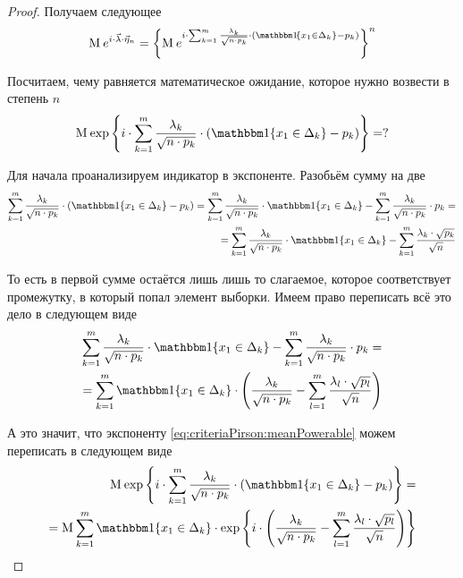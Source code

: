 \begin{proof}
  Получаем следующее
  \begin{align*}
      \mean{e^{i \cdot \vec{\lambda} \cdot \vec{\eta}_n}}
      = \left\{ \mean{e^{i \cdot \sum_{k=1}^{m}\frac{\lambda_k}{
          \sqrt{n \cdot p_k}} \cdot \left(
          \Indicator{x_1 \in \Delta_k} - p_k \right)}} \right\}^n
  \end{align*}

  Посчитаем, чему равняется математическое ожидание, которое нужно возвести
  в степень $n$
  \begin{equation}\label{eq:criteriaPirson:meanPowerable}
      \mean{\exp{\left\{ i \cdot \sum_{k=1}^{m}\frac{\lambda_k}{
          \sqrt{n \cdot p_k}} \cdot \left(
          \Indicator{x_1 \in \Delta_k} - p_k \right) \right\}}} = ?
  \end{equation}

  Для начала проанализируем индикатор в экспоненте.
  Разобьём сумму на две
  \begin{align*}
      \sum_{k=1}^{m}\frac{\lambda_k}{\sqrt{n \cdot p_k}} \cdot \left(
          \Indicator{x_1 \in \Delta_k} - p_k \right)
      = \sum_{k=1}^{m}\frac{\lambda_k}{\sqrt{n \cdot p_k}}
          \cdot \Indicator{x_1 \in \Delta_k}
      - \sum_{k=1}^{m}\frac{\lambda_k}{\sqrt{n \cdot p_k}} \cdot p_k = \\
      = \sum_{k=1}^{m}\frac{\lambda_k}{\sqrt{n \cdot p_k}}
          \cdot \Indicator{x_1 \in \Delta_k}
      - \sum_{k=1}^{m}\frac{\lambda_k \cdot \sqrt{p_k}}{\sqrt{n}}
  \end{align*}

  То есть в первой сумме остаётся лишь лишь то слагаемое, которое
  соответствует промежутку, в который попал элемент выборки. Имеем право
  переписать всё это дело в следующем виде
  \begin{align*}
      \sum_{k=1}^{m}\frac{\lambda_k}{\sqrt{n \cdot p_k}}
          \cdot \Indicator{x_1 \in \Delta_k}
      - \sum_{k=1}^{m}\frac{\lambda_k}{\sqrt{n \cdot p_k}} \cdot p_k = \\
      = \sum_{k=1}^{m} \Indicator{x_1 \in \Delta_k} \cdot \left(
      \frac{\lambda_k}{\sqrt{n \cdot p_k}} - \sum_{l=1}^{m}
          \frac{\lambda_l \cdot \sqrt{p_l}}{\sqrt{n}} \right)
  \end{align*}

  А это значит, что экспоненту \eqref{eq:criteriaPirson:meanPowerable} можем
  переписать в следующем виде
  \begin{align*}
      \mean{\exp{\left\{ i \cdot \sum_{k=1}^{m}\frac{\lambda_k}{
          \sqrt{n \cdot p_k}} \cdot \left(
          \Indicator{x_1 \in \Delta_k} - p_k \right) \right\}}} = \\
      = \mean{\sum_{k=1}^{m} \Indicator{x_1 \in \Delta_k} \cdot
      \exp{\left\{ i \cdot \left( \frac{\lambda_k}{\sqrt{n \cdot p_k}}
          - \sum_{l=1}^{m} \frac{\lambda_l \cdot \sqrt{p_l}}{\sqrt{n}}
          \right) \right\}}}
  \end{align*}


\end{proof}
